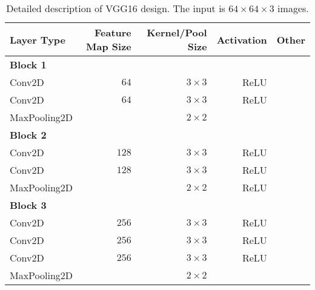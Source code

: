 \begin{table}[H]
	\centering
	\caption{Detailed description of VGG16 design. The input is $64\times64\times3$ images.}
	\label{tab:vgg16}
	\begin{tabular}{lrrrr}
		\textbf{Layer Type}     & \textbf{Feature Map Size} & \textbf{Kernel/Pool Size} & \textbf{Activation} & \textbf{Other} \\ \hline
		\textbf{Block 1}        &                           &                           &                     &                \\
		\rowcolor{lightGrey}  
		Conv2D                  & $64$                      & $3\times3$                & ReLU                &                \\
		Conv2D                  & $64$                      & $3\times3$                & ReLU                &                \\
		\rowcolor{lightGrey} 
		MaxPooling2D            &                           & $2\times2$                &                     &                \\
		\textbf{Block 2}        &                           &                           &                     &                \\
		\rowcolor{lightGrey}  
		Conv2D                  & $128$                     & $3\times3$                & ReLU                &                \\
		Conv2D                  & $128$                     & $3\times3$                & ReLU                &                \\
		\rowcolor{lightGrey}  
		MaxPooling2D            &                       &    $2\times2$             & ReLU                &                \\
		\textbf{Block 3}        &                           &                           &                     &                \\
		\rowcolor{lightGrey}  
		Conv2D                  & $256$                     & $3\times3$                & ReLU                &                \\
		Conv2D                  & $256$                     & $3\times3$                & ReLU                &                \\
		\rowcolor[HTML]{EFEFEF} 
		Conv2D                  & $256$                     & $3\times3$                & ReLU                &                \\
		MaxPooling2D            &               &          $2\times2$                  &                     &                \\

\end{tabular}
\end{table}
